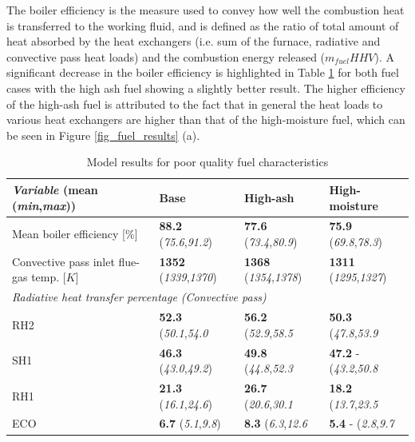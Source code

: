 \documentclass[a4paper,fleqn]{cas-dc}
\begin{document}
The boiler efficiency is the measure used to convey how well the combustion heat is transferred to the working fluid, and is defined as the ratio of total amount of heat absorbed by the heat exchangers (i.e. sum of the furnace, radiative and convective pass heat loads) and the combustion energy released ($m_{fuel}HHV$). A significant decrease in the boiler efficiency is highlighted in Table \ref{tbl_fuel_results} for both fuel cases with the high ash fuel showing a slightly better result. The higher efficiency of the high-ash fuel is attributed to the fact that in general the heat loads to various heat exchangers are higher than that of the high-moisture fuel, which can be seen in Figure \ref{fig_fuel_results} (a). 

\begin{table}[h!]
\caption{Model results for poor quality fuel characteristics}\label{tbl_fuel_results}
\begin{tabular*}{\tblwidth}{p{}p{}p{}p{}}
\toprule
\textit{Variable} (\textbf{mean}  (\textit{min},\textit{max}))& Base & High-ash & High-moisture \\ %
\midrule
Mean boiler efficiency [\%]& \textbf{88.2}  (\textit{75.6},\textit{91.2}) & \textbf{77.6}  (\textit{73.4},\textit{80.9}) & \textbf{75.9}  (\textit{69.8},\textit{78.3})\\
Convective pass inlet flue-gas temp. [$K$]& \textbf{1352}  (\textit{1339},\textit{1370}) & \textbf{1368}  (\textit{1354},\textit{1378}) & \textbf{1311}  (\textit{1295},\textit{1327})\\
\midrule
\multicolumn{4}{l}{\textit{Radiative heat transfer percentage (Convective pass)} }\\
\midrule
RH2 & \textbf{52.3}  (\textit{50.1},\textit{54.0}& \textbf{56.2}  (\textit{52.9},\textit{58.5} & \textbf{50.3}  (\textit{47.8},\textit{53.9}\\
SH1 & \textbf{46.3}  (\textit{43.0},\textit{49.2})& \textbf{49.8}  (\textit{44.8},\textit{52.3}& \textbf{47.2} - (\textit{43.2},\textit{50.8}\\
RH1 & \textbf{21.3}  (\textit{16.1},\textit{24.6})& \textbf{26.7}  (\textit{20.6},\textit{30.1}& \textbf{18.2}  (\textit{13.7},\textit{23.5}\\
ECO & \textbf{6.7}  (\textit{5.1},\textit{9.8})& \textbf{8.3}  (\textit{6.3},\textit{12.6}& \textbf{5.4} - (\textit{2.8},\textit{9.7}\\
\bottomrule
\end{tabular*}
\end{table}  
\end{document}
